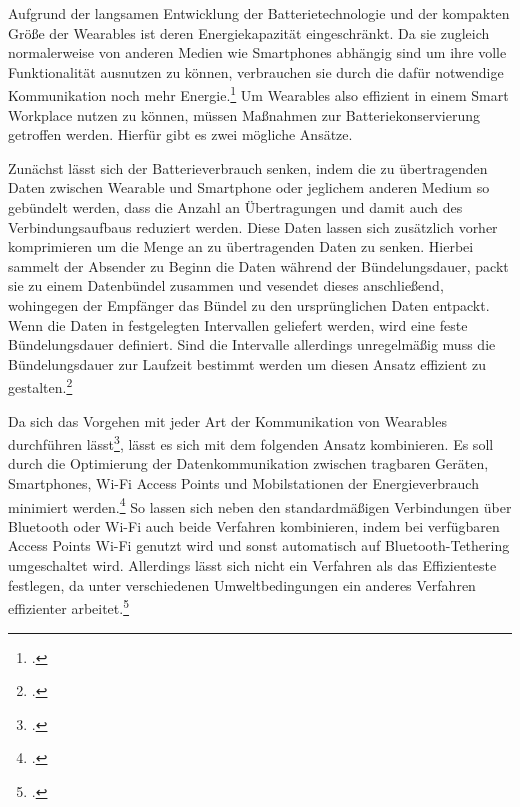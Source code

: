Aufgrund der langsamen Entwicklung der Batterietechnologie und der kompakten Größe der Wearables ist deren Energiekapazität eingeschränkt. Da sie zugleich normalerweise von anderen Medien wie Smartphones abhängig sind um ihre volle Funktionalität ausnutzen zu können, verbrauchen sie durch die dafür notwendige Kommunikation noch mehr Energie.\footcite[Vgl.][Seite 33]{wearable1} Um Wearables also effizient in einem Smart Workplace nutzen zu können, müssen Maßnahmen zur Batteriekonservierung getroffen werden. Hierfür gibt es zwei mögliche Ansätze.

Zunächst lässt sich der Batterieverbrauch senken, indem die zu übertragenden Daten zwischen Wearable und Smartphone oder jeglichem anderen Medium so gebündelt werden, dass die Anzahl an Übertragungen und damit auch des Verbindungsaufbaus reduziert werden. Diese Daten lassen sich zusätzlich vorher komprimieren um die Menge an zu übertragenden Daten zu senken. Hierbei sammelt der Absender zu Beginn die Daten während der Bündelungsdauer, packt sie zu einem Datenbündel zusammen und vesendet dieses anschließend, wohingegen der Empfänger das Bündel zu den ursprünglichen Daten entpackt. Wenn die Daten in festgelegten Intervallen geliefert werden, wird eine feste Bündelungsdauer definiert. Sind die Intervalle allerdings unregelmäßig muss die Bündelungsdauer zur Laufzeit bestimmt werden um diesen Ansatz effizient zu gestalten.\footcite[Vgl.][Seite 76 f.]{wearable2}

Da sich das Vorgehen mit jeder Art der Kommunikation von Wearables durchführen lässt\footcite[Vgl.][Seite 77]{wearable2}, lässt es sich mit dem folgenden Ansatz kombinieren. Es soll durch die Optimierung der Datenkommunikation zwischen tragbaren Geräten, Smartphones, Wi-Fi Access Points und Mobilstationen der Energieverbrauch minimiert werden.\footcite[Vgl.][Seite 33]{wearable1} So lassen sich neben den standardmäßigen Verbindungen über Bluetooth oder Wi-Fi auch beide Verfahren kombinieren, indem bei verfügbaren Access Points Wi-Fi genutzt wird und sonst automatisch auf Bluetooth-Tethering umgeschaltet wird. Allerdings lässt sich nicht ein Verfahren als das Effizienteste festlegen, da unter verschiedenen Umweltbedingungen ein anderes Verfahren effizienter arbeitet.\footcite[Vgl.][Seite 35]{wearable1}
